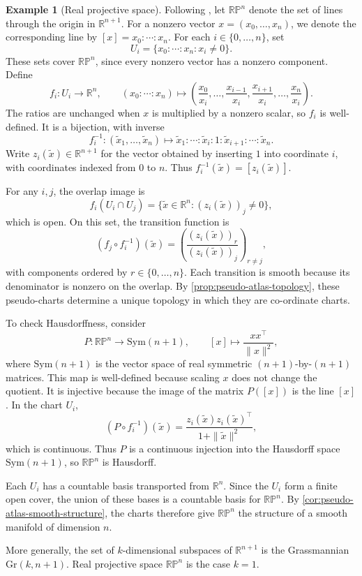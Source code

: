 \documentclass[12pt]{article}
\theoremstyle{definition}
\newtheorem{example}[definition]{Example}
\theoremstyle{plain}
\theoremstyle{remark}
\newcommand{\R}{\mathbb{R}}
\newcommand{\Sym}{\mathrm{Sym}}              %
\begin{document}
\begin{example}[Real projective space]\label{ex:real-projective-space}
  Following \cite[Example 2.30]{segal}, let \( \mathbb{RP}^n \) denote the set of lines through the origin in \( \R^{n+1} \). For a nonzero vector \( x = (x_0, \dots, x_n) \), we denote the corresponding line by \( [x] = x_0 : \cdots : x_n \).
  For each \( i \in \{0, \dots, n\} \), set
  \[
    U_i = \{x_0 : \cdots : x_n : x_i \ne 0\}.
  \]
  These sets cover \( \mathbb{RP}^n \), since every nonzero vector has a nonzero component. Define
  \[
    f_i : U_i \longrightarrow \R^n, \qquad
    (x_0 : \cdots : x_n) \mapsto
    \left(\frac{x_0}{x_i}, \dots, \frac{x_{i-1}}{x_i}, \frac{x_{i+1}}{x_i}, \dots, \frac{x_n}{x_i}\right).
  \]
  The ratios are unchanged when \( x \) is multiplied by a nonzero scalar, so \( f_i \) is well-defined. It is a bijection, with inverse
  \[
    f_i^{-1} : (\tilde{x}_1, \dots, \tilde{x}_n) \mapsto
    \tilde{x}_1 : \cdots : \tilde{x}_i : 1 : \tilde{x}_{i+1} : \cdots : \tilde{x}_n.
  \]
  Write \( z_i(\tilde{x}) \in \R^{n+1} \) for the vector obtained by inserting \( 1 \) into coordinate \( i \), with coordinates indexed from \( 0 \) to \( n \). Thus \( f_i^{-1}(\tilde{x}) = [z_i(\tilde{x})] \).

  For any \( i,j \), the overlap image is
  \[
    f_i(U_i \cap U_j) = \{\tilde{x} \in \R^n : (z_i(\tilde{x}))_j \ne 0\},
  \]
  which is open. On this set, the transition function is
  \[
    (f_j \circ f_i^{-1})(\tilde{x})
    = \left(\frac{(z_i(\tilde{x}))_r}{(z_i(\tilde{x}))_j}\right)_{r\ne j},
  \]
  with components ordered by \( r \in \{0,\dots,n\} \). Each transition is smooth because its denominator is nonzero on the overlap. By \cref{prop:pseudo-atlas-topology}, these pseudo-charts determine a unique topology in which they are co-ordinate charts.

  To check Hausdorffness, consider
  \[
    P : \mathbb{RP}^n \longrightarrow \Sym(n+1), \qquad
    [x] \longmapsto \frac{xx^\top}{\|x\|^2},
  \]
  where \( \Sym(n+1) \) is the vector space of real symmetric \( (n+1) \)-by-\( (n+1) \) matrices. This map is well-defined because scaling \( x \) does not change the quotient. It is injective because the image of the matrix \( P([x]) \) is the line \( [x] \). In the chart \( U_i \),
  \[
    (P \circ f_i^{-1})(\tilde{x})
    = \frac{z_i(\tilde{x})z_i(\tilde{x})^\top}{1+\|\tilde{x}\|^2},
  \]
  which is continuous. Thus \( P \) is a continuous injection into the Hausdorff space \( \Sym(n+1) \), so \( \mathbb{RP}^n \) is Hausdorff.

  Each \( U_i \) has a countable basis transported from \( \R^n \). Since the \( U_i \) form a finite open cover, the union of these bases is a countable basis for \( \mathbb{RP}^n \). By \cref{cor:pseudo-atlas-smooth-structure}, the charts therefore give \( \mathbb{RP}^n \) the structure of a smooth manifold of dimension \( n \).

  More generally, the set of \( k \)-dimensional subspaces of \( \R^{n+1} \) is the Grassmannian \( \mathrm{Gr}(k,n+1) \). Real projective space \( \mathbb{RP}^n \) is the case \( k=1 \).
\end{example}
\end{document}
